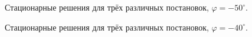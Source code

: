 \documentclass[14pt, a4paper, fleqn]{extarticle}
\begin{document}
\begin{figure}[H]
\caption{Стационарные решения для трёх различных постановок, $\varphi = -50^\circ$.}
\end{figure}

\begin{figure}[H]
\caption{Стационарные решения для трёх различных постановок, $\varphi = -40^\circ$.}
\end{figure}
\end{document}
